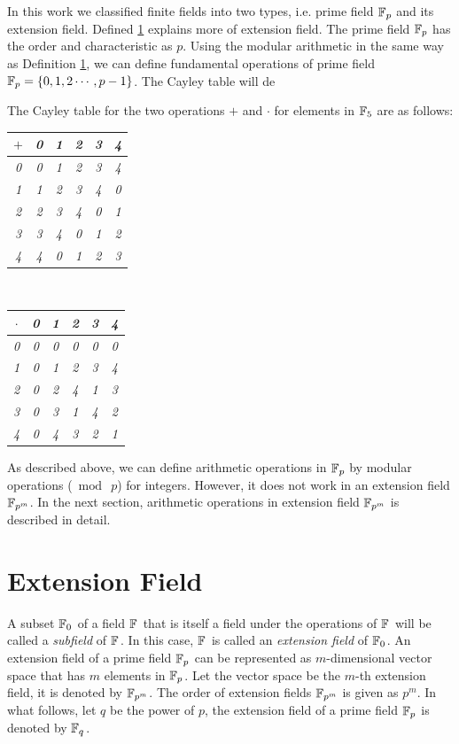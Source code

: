 In this work we classified finite fields into two types, i.e.  prime field ${\mathbb{F}}_{p}$ and its extension field. 
Defined \ref{sec:chap:fund:extenion_field} explains more of extension field.
The prime field ${\mathbb{F}}_{p}$ has  the order and characteristic as $p$.
Using the modular arithmetic in the same way as Definition \ref{sec:chap:fund:extenion_field}, we can define fundamental operations of prime field ${\mathbb{F}}_{p}=\{0,1,2\cdots,p-1\}$.
The Cayley table will de
\begin{example}The Cayley table for the two operations $+$ and $\cdot$ for elements in ${\mathbb{F}}_{5}$ are as follows:
	\begin{center}
		\begin{tabular}{c|ccccc}
			$+$&\em 0&\em 1&\em 2&\em 3&\em 4       \\
			\hline
			\em 0&\em 0&\em 1&\em 2&\em 3&\em 4       \\
			\em 1&\em 1&\em 2&\em 3&\em 4&\em 0      \\
			\em 2&\em 2&\em 3&\em 4&\em 0&\em 1      \\
			\em 3&\em 3&\em 4&\em 0&\em 1&\em 2      \\
			\em 4&\em 4&\em 0&\em 1&\em 2&\em 3      \\
		\end{tabular}\ \ 
		\begin{tabular}{c|ccccc}
			$\cdot$&\em 0&\em 1&\em 2&\em 3&\em 4       \\
			\hline
			\em 0&\em 0&\em 0&\em 0&\em 0&\em 0       \\
			\em 1&\em 0&\em 1&\em 2&\em 3&\em 4      \\
			\em 2&\em 0&\em 2&\em 4&\em 1&\em 3      \\
			\em 3&\em 0&\em 3&\em 1&\em 4&\em 2      \\
			\em 4&\em 0&\em 4&\em 3&\em 2&\em 1      \\
		\end{tabular}
	\end{center}
\end{example}
As described above, we can define arithmetic operations in ${\mathbb{F}}_{p}$ by modular operations ($\bmod\ p$) for integers. However, it does not work in an extension field ${\mathbb{F}}_{p^{m}}$. In the next section, arithmetic operations in extension field ${\mathbb{F}}_{p^{m}}$ is described in detail.


\section{Extension Field} 
\label{sec:chap:fund:extenion_field}
A subset ${\mathbb{F}}_{0^{}}$ of a field ${\mathbb{F}}_{^{}}$ that is itself a field under the operations of ${\mathbb{F}}_{^{}}$ will be called a {\it subfield} of ${\mathbb{F}}_{^{}}$.
In this case, ${\mathbb{F}}_{^{}}$ is called an {\it extension field} of ${\mathbb{F}}_{0^{}}$.
An extension field of a prime field ${\mathbb{F}}_{p^{}}$ can be represented as $m$-dimensional vector space that has $m$ elements in ${\mathbb{F}}_{p^{}}$.
Let the vector space be the $m$-th extension field, it is denoted by ${\mathbb{F}}_{p^{m}}$.
The order of extension fields ${\mathbb{F}}_{p^{m}}$ is given as $p^m$. 
In what follows, let $q$ be the power of $p$, the extension field of a prime field ${\mathbb{F}}_{p^{}}$ is denoted by ${\mathbb{F}}_{q^{}}$.



